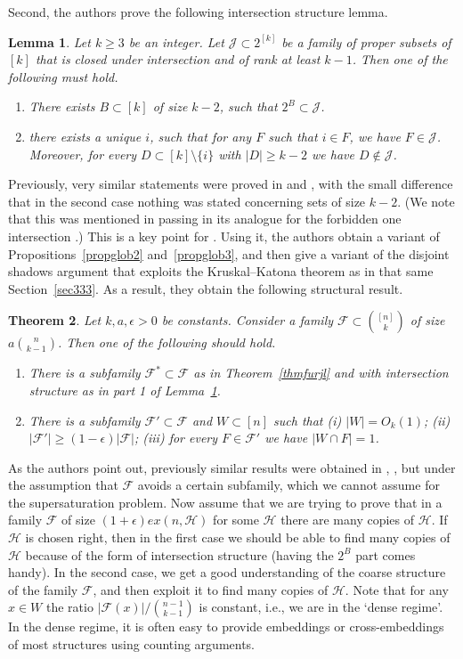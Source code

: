 \documentclass[graybox]{svmult}
\renewcommand{\ge}{\geqslant}
\newcommand{\ff}{\mathcal{F}}
\newcommand{\m}{\mathcal}
\newtheorem{thm}{Theorem}
\newtheorem{lem}[thm]{Lemma}
\begin{document}
Second, the authors prove the following intersection structure lemma.

\begin{lem}\label{lemstrucjl}
  Let $k\ge 3$ be an integer. Let $\m J\subset 2^{[k]}$ be a family of proper subsets of $[k]$ that is closed under intersection and of rank at least $k-1$. Then one of the following must hold.
  \begin{enumerate}
    \item There exists $B\subset [k]$ of size $k-2$, such that $2^{B} \subset \m J$.
    \item there exists a unique $i$, such that for any $F$ such that $i\in F$, we have $F\in \m J$. Moreover, for every $D\subset [k]\setminus \{i\}$ with $|D|\ge k-2$ we have $D\notin \m J$.
  \end{enumerate}
\end{lem}
Previously, very similar statements were proved in \cite{FF2} and \cite{FJ15}, with the small difference that in the second case nothing was stated concerning sets of size $k-2$. (We note that this was mentioned in passing in its analogue for the forbidden one intersection \cite[Lemma 5.5a]{FF1}.) This is a key point for \cite{JL}. Using it, the authors obtain a variant of Propositions~\ref{propglob2} and~\ref{propglob3}, and then give a variant of the disjoint shadows argument that exploits the Kruskal--Katona theorem as in that same Section~\ref{sec333}. As a result, they obtain the following structural result.
\begin{thm}
Let $k,a,\epsilon>0$ be constants. Consider a family $\ff\subset {[n]\choose k}$ of size $a{n\choose k-1}$. Then one of the following should hold.
\begin{enumerate}
  \item There is a subfamily $\ff^*\subset\ff$ as in Theorem~\ref{thmfurjl} and with intersection structure as in part 1 of Lemma~\ref{lemstrucjl}.
  \item There is a subfamily $\ff'\subset \ff$ and $W\subset [n]$ such that (i) $|W|=O_k(1)$; (ii) $|\ff'|\ge (1-\epsilon)|\ff|$; (iii) for every $F\in \ff'$ we have $|W\cap F| = 1$.
\end{enumerate}
\end{thm}
As the authors point out, previously similar results were obtained in \cite{Fu14}, \cite{FJ15}, but under the assumption that $\ff$ avoids a certain subfamily, which we cannot assume for the supersaturation problem.
Now assume that we are trying to prove that in a family $\ff$ of size $(1+\epsilon)ex(n, \m H)$ for some $\m H$ there are many copies of $\m H$. If $\m H$ is chosen right, then in the first case  we should be able to find many copies of $\m H$ because of the form of intersection structure (having the $2^B$ part comes handy). In the second case, we get a good understanding of the coarse structure of the family $\ff$, and then exploit it to find many copies of $\m H$. Note that for any $x\in W$ the ratio $|\ff(x)|/{n-1\choose k-1}$ is constant, i.e., we are in the `dense regime'. In the dense regime, it is often easy to provide embeddings or cross-embeddings of most structures using counting arguments.  
\end{document}
